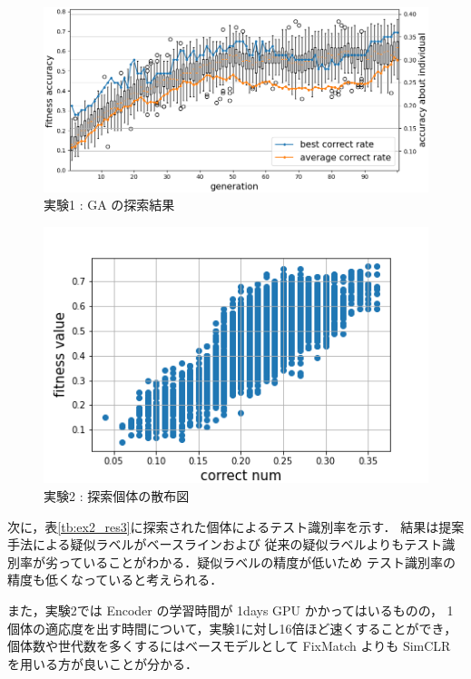 \begin{figure}[h]
	\begin{center}
		\includegraphics[scale=0.65]{./images/ex2_res_graph.png}
		\caption{実験1 : GA の探索結果\label{fig:ex2_res1}}
	\end{center}
\end{figure}


\begin{figure}[h]
	\begin{center}
		\includegraphics[scale=1.0]{./images/ex2_res_img.png}
		\caption{実験2 : 探索個体の散布図\label{fig:ex2_res2}}
	\end{center}
\end{figure}


次に，表\ref{tb:ex2_res3}に探索された個体によるテスト識別率を示す．
結果は提案手法による疑似ラベルがベースラインおよび
従来の疑似ラベルよりもテスト識別率が劣っていることがわかる．疑似ラベルの精度が低いため
テスト識別率の精度も低くなっていると考えられる．

\begin{table}[h]
	\centering
	\caption{実験2 : テスト識別率\label{tb:ex2_res3}}
\end{table}

また，実験2では Encoder の学習時間が 1days GPU かかってはいるものの，
1個体の適応度を出す時間について，実験1に対し16倍ほど速くすることができ，
個体数や世代数を多くするにはベースモデルとして FixMatch よりも SimCLR を用いる方が良いことが分かる．

